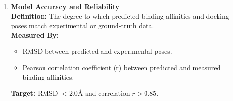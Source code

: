 \documentclass[12pt,a4]{report}
\begin{document}
\begin{enumerate}[label=\textbf{\Alph*.}, leftmargin=1.2cm]
    \vspace{0.4cm}
    \item \textbf{Model Accuracy and Reliability} \\
    \hspace{0.3in}
    \textbf{Definition:} The degree to which predicted binding affinities and docking poses match experimental or ground-truth data. \\
    \hspace{0.3in}
    \textbf{Measured By:}
    \begin{itemize}
        \item RMSD between predicted and experimental poses.
        \item Pearson correlation coefficient (r) between predicted and measured binding affinities.
    \end{itemize}
    \hspace{0.3in}
    \textbf{Target:} RMSD \(< 2.0 \text{\AA}\) and correlation \(r > 0.85\).
\end{enumerate}

\vspace{0.6cm}
\end{document}
